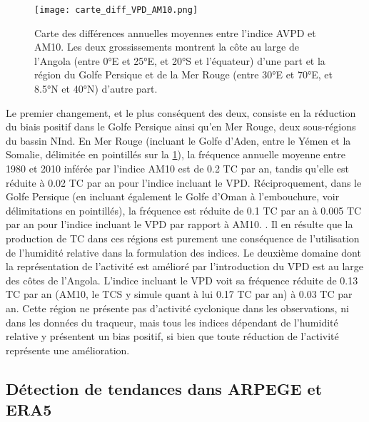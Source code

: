 \documentclass[../main.tex]{subfiles}
\begin{document}
\begin{figure}[tb]
    \centering
    \texttt{[image: carte\_diff\_VPD\_AM10.png]}
    \caption{Carte des différences annuelles moyennes entre l'indice AVPD et AM10. Les deux grossissements montrent la côte au large de l'Angola (entre \ang{0}E
    et \ang{25}E, et \ang{20}S et l'équateur) d'une part et la région du Golfe Persique et de la Mer Rouge (entre \ang{30}E et \ang{70}E, et \ang{8.5}N et
    \ang{40}N) d'autre part.}
    \label{fig:diff_VPD_AM10}
\end{figure}

Le premier changement, et le plus conséquent des deux, consiste en la réduction du biais positif dans le Golfe Persique ainsi qu'en Mer Rouge, deux sous-régions
du bassin NInd. En Mer Rouge (incluant le Golfe d'Aden, entre le Yémen et la Somalie, délimitée en pointillés sur la \cref{fig:diff_VPD_AM10}), la fréquence
annuelle moyenne entre \num{1980} et \num{2010} inférée par l'indice AM10 est de \num{0.2} TC par an, tandis qu'elle est réduite à \num{0.02} TC par an pour
l'indice incluant le VPD. Réciproquement, dans le Golfe Persique (en incluant également le Golfe d'Oman à l'embouchure, voir délimitations en pointillés), la
fréquence est réduite de \num{0.1} TC par an à \num{0.005} TC par an pour l'indice incluant le VPD par rapport à AM10. . Il en résulte que la production de TC
dans ces régions est purement une conséquence de l'utilisation de l'humidité relative dans la formulation des indices. Le deuxième domaine dont la
représentation de l'activité est amélioré par l'introduction du VPD est au large des côtes de l'Angola. L'indice incluant le VPD voit sa fréquence réduite de
\num{0.13} TC par an (AM10, le TCS y simule quant à lui \num{0.17} TC par an) à \num{0.03} TC par an. Cette région ne présente pas d'activité cyclonique dans
les observations, ni dans les données du traqueur, mais tous les indices dépendant de l'humidité relative y présentent un bias positif, si bien que toute
réduction de l'activité représente une amélioration.

\subsection{Détection de tendances dans ARPEGE et ERA5}
\end{document}
